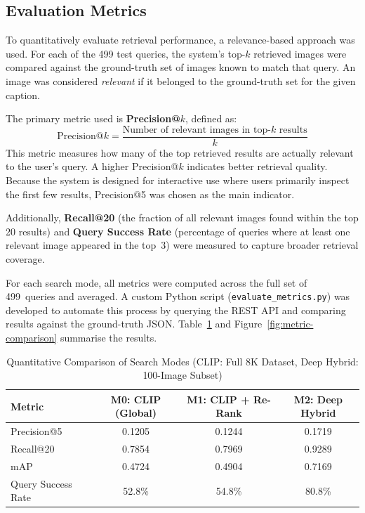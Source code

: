 \documentclass[12pt,a4paper,oneside]{report}
\begin{document}
\subsection{Evaluation Metrics}

To quantitatively evaluate retrieval performance, a relevance-based approach
was used.  For each of the 499 test queries, the system's top-$k$ retrieved
images were compared against the ground-truth set of images known to match
that query.  An image was considered \emph{relevant} if it belonged to the
ground-truth set for the given caption.

The primary metric used is \textbf{Precision@$k$}, defined as:
\[
  \text{Precision@}k
    = \frac{\text{Number of relevant images in top-}k\text{ results}}{k}
\]
This metric measures how many of the top retrieved results are actually
relevant to the user's query.  A higher Precision@$k$ indicates better
retrieval quality.  Because the system is designed for interactive use where
users primarily inspect the first few results, Precision@5 was chosen as the
main indicator.

Additionally, \textbf{Recall@20} (the fraction of all relevant images
found within the top 20 results) and \textbf{Query Success Rate} (percentage
of queries where at least one relevant image appeared in the top~3) were
measured to capture broader retrieval coverage.

For each search mode, all metrics were computed across the full set of
499~queries and averaged.  A custom Python script
(\texttt{evaluate\_metrics.py}) was developed to automate this process by
querying the REST API and comparing results against the ground-truth JSON.
Table~\ref{tab:search-metrics} and Figure~\ref{fig:metric-comparison}
summarise the results.

\begin{table}[H]
\centering\small
\caption{Quantitative Comparison of Search Modes (CLIP: Full 8K Dataset, Deep Hybrid: 100-Image Subset)}
\label{tab:search-metrics}
\renewcommand{\arraystretch}{1.4}
\begin{tabular}{|l|c|c|c|}
\hline
\textbf{Metric} & \textbf{M0: CLIP (Global)} & \textbf{M1: CLIP + Re-Rank} & \textbf{M2: Deep Hybrid} \\
\hline
Precision@5 & 0.1205 & 0.1244 & 0.1719 \\
\hline
Recall@20 & 0.7854 & 0.7969 & 0.9289 \\
\hline
mAP & 0.4724 & 0.4904 & 0.7169 \\
\hline
Query Success Rate & 52.8\% & 54.8\% & 80.8\% \\
\hline
\end{tabular}
\end{table}
\end{document}
